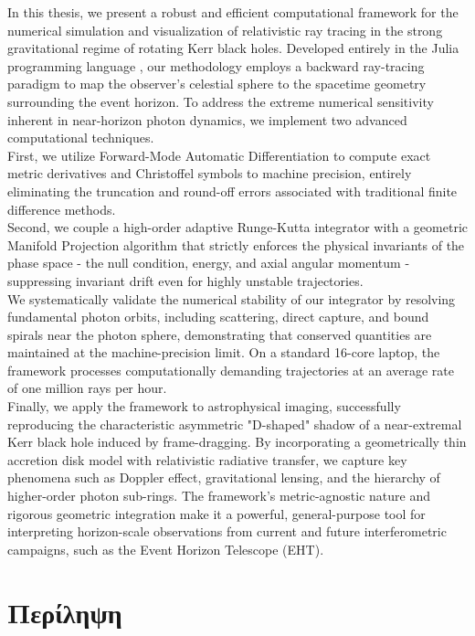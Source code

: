 \documentclass[11pt]{book}
\begin{document}
In this thesis, we present a robust and efficient computational framework for the numerical simulation and visualization of relativistic ray tracing in the strong gravitational regime of rotating Kerr black holes. Developed entirely in the Julia programming language \cite{Bezanson2017}, our methodology employs a backward ray-tracing paradigm to map the observer's celestial sphere to the spacetime geometry surrounding the event horizon. To address the extreme numerical sensitivity inherent in near-horizon photon dynamics, we implement two advanced computational techniques.\\
First, we utilize Forward-Mode Automatic Differentiation to compute exact metric derivatives and Christoffel symbols to machine precision, entirely eliminating the truncation and round-off errors associated with traditional finite difference methods. \\
Second, we couple a high-order adaptive Runge-Kutta integrator with a geometric Manifold Projection algorithm that strictly enforces the physical invariants of the phase space - the null condition, energy, and axial angular momentum - suppressing invariant drift even for highly unstable trajectories.\\
We systematically validate the numerical stability of our integrator by resolving fundamental photon orbits, including scattering, direct capture, and bound spirals near the photon sphere, demonstrating that conserved quantities are maintained at the machine-precision limit. On a standard 16-core laptop, the framework processes computationally demanding trajectories at an average rate of one million rays per hour.\\
 Finally, we apply the framework to astrophysical imaging, successfully reproducing the characteristic asymmetric "D-shaped" shadow of a near-extremal Kerr black hole induced by frame-dragging. By incorporating a geometrically thin accretion disk model with relativistic radiative transfer, we capture key phenomena such as Doppler effect, gravitational lensing, and the hierarchy of higher-order photon sub-rings. The framework's metric-agnostic nature and rigorous geometric integration make it a powerful, general-purpose tool for interpreting horizon-scale observations from current and future interferometric campaigns, such as the Event Horizon Telescope (EHT).
\newpage

\section*{Περίληψη}
\end{document}
